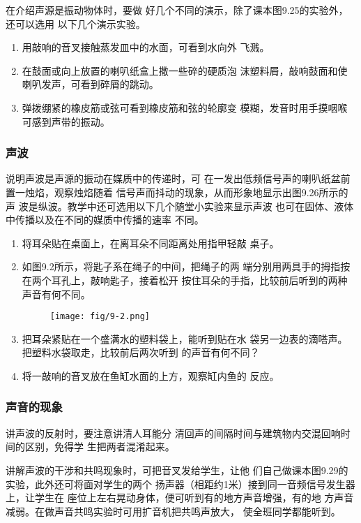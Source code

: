 在介绍声源是振动物体时，要做
好几个不同的演示，除了课本图9.25的实验外，还可以选用
以下几个演示实验。
\begin{enumerate}
\item 用敲响的音叉接触蒸发皿中的水面，可看到水向外
飞溅。
\item 在鼓面或向上放置的喇叭纸盒上撒一些碎的硬质泡
沫塑料屑，敲响鼓面和使喇叭发声，可看到碎屑的跳动。
\item 弹拨绷紧的橡皮筋或弦可看到橡皮筋和弦的轮廓变
模糊，发音时用手摸咽喉可感到声带的振动。
\end{enumerate}

\subsubsection{声波}

说明声波是声源的振动在媒质中的传递时，可
在一发出低频信号声的喇叭纸盆前置一烛焰，观察烛焰随着
信号声而抖动的现象，从而形象地显示出图9.26所示的声
波是纵波。教学中还可选用以下几个随堂小实验来显示声波
也可在固体、液体中传播以及在不同的媒质中传播的速率
不同。
\begin{enumerate}
\item 将耳朵贴在桌面上，在离耳朵不同距离处用指甲轻敲
桌子。
\item 如图9.2所示，将匙子系在绳子的中间，把绳子的两
端分别用两具手的拇指按在两个耳孔上，敲响匙子，接着松开
按住耳朵的手指，比较前后听到的两种声音有何不同。
\begin{figure}[htp]
    \centering
\texttt{[image: fig/9-2.png]}
    \caption{}
\end{figure}

\item 把耳朵紧贴在一个盛满水的塑料袋上，能听到贴在水
袋另一边表的滴嗒声。把塑料水袋取走，比较前后两次听到
的声音有何不同？
\item 将一敲响的音叉放在鱼缸水面的上方，观察缸内鱼的
反应。
\end{enumerate}

\subsubsection{声音的现象} 

讲声波的反射时，要注意讲清人耳能分
清回声的间隔时间与建筑物内交混回响时间的区别，免得学
生把两者混淆起来。

讲解声波的干涉和共鸣现象时，可把音叉发给学生，让他
们自己做课本图9.29的实验，此外还可将面对学生的两个
扬声器（相距约1米）接到同一音频信号发生器上，让学生在
座位上左右晃动身体，便可听到有的地方声音增强，有的地
方声音减弱。在做声音共鸣实验时可用扩音机把共鸣声放大，
使全班同学都能听到。


